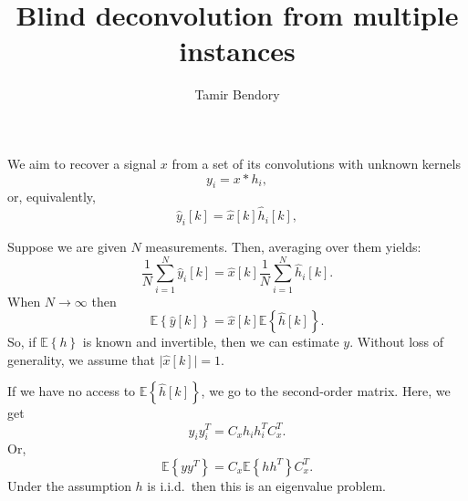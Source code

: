 \documentclass[english, onecolumn]{IEEEtran}
\numberwithin{equation}{section}
\numberwithin{figure}{section}
\theoremstyle{plain}
\theoremstyle{definition}
\theoremstyle{remark}
\theoremstyle{plain}
\theoremstyle{remark}
\theoremstyle{plain}
\theoremstyle{plain}
\newcommand{\E}[1]{\mathbb{E}\left\{ {#1} \right\}}
\begin{document}


\title{Blind deconvolution from multiple instances}

 \author{Tamir Bendory}

\maketitle

We aim to recover a signal $x$ from a set of its convolutions with unknown kernels 
\begin{equation}
y_i = x \ast h_i,
\end{equation}
or, equivalently,
\begin{equation}
\hat{y}_i[k] = \hat{x}[k]  \hat{h}_i[k],
\end{equation}

Suppose we are given $N$ measurements. Then, averaging over them yields:
\begin{equation}
\frac{1}{N}\sum_{i=1}^N\hat{y}_i[k] = \hat{x}[k]  \frac{1}{N}\sum_{i=1}^N \hat{h}_i[k].
\end{equation} 
When $N\to \infty$ then 
\begin{equation}
\E{\hat{y}[k]} = \hat{x}[k]   \E{\hat{h}[k]}.
\end{equation} 
So, if $ \E{{h}}$ is known and invertible, then we can estimate $y$. Without loss of generality, we assume that $\vert\hat{x}[k]\vert=1 $. 

If we have no access to  $\E{\hat{h}[k]}$, we go to the second-order matrix. Here, we get 
\begin{equation}
y_iy_i^T = C_xh_ih_i^TC_x^T.
\end{equation}
Or, 
\begin{equation}
\E{yy^T} = C_x\E{hh^T}C_x^T.
\end{equation}
Under the assumption $h$ is i.i.d.\, then this is an eigenvalue problem.




%
%
\end{document}
